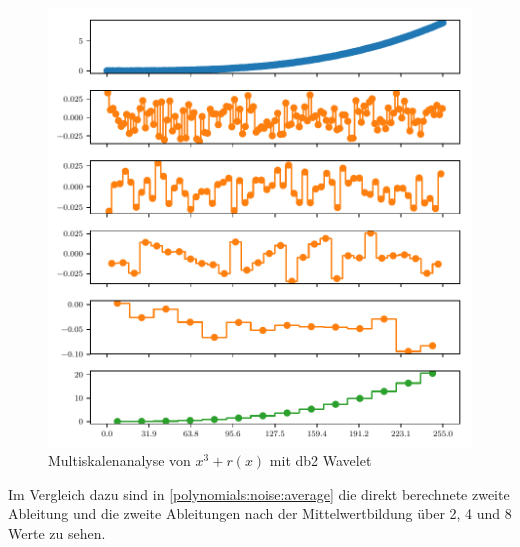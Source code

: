 \begin{refsection}
\begin{figure}
    \centering
    \includegraphics{papers/polynomials/images/polynomials_noise_db2_multi.pdf}
    \caption{Multiskalenanalyse von $x^3 + r(x)$ mit db2 Wavelet\label{polynomials:noise:db2_multi}}
\end{figure}

Im Vergleich dazu sind in \cref{polynomials:noise:average} die direkt
berechnete zweite Ableitung und die zweite Ableitungen nach der
Mittelwertbildung über 2, 4 und 8 Werte zu sehen.


\end{refsection}

